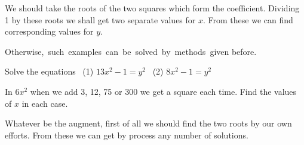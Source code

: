 \documentclass[]{article}
\begin{document}
{\begin{quote}  {
}  \end{quote}

{We should take the roots of the two squares which form the coefficient.
Dividing 1 by these roots we shall get two separate values for $x$. From
these we can find corresponding values for $y$.}

\newpage
\large

{Otherwise, \,such \,examples \,can \,be \,solved \,by \,methods \,given before.}

\begin{quote}  {
}  \end{quote}

{Solve the equations ~(1) $13x^{2} - 1 = y^{2}$ ~(2) $8x^{2} - 1 =y^{2}$}

\begin{quote}  {
}  \end{quote}

{In $6x^{2}$ when we add 3, 12, 75 or 300 we get a square each time. Find the values of $x$ in each case.}

\begin{quote}  {
}  \end{quote}

{Whatever be the augment, first of all we should find the two roots by our own efforts. From these we can get by {} process any number of
solutions.}

\begin{quote}  {
}  \end{quote}

}
\end{document}
